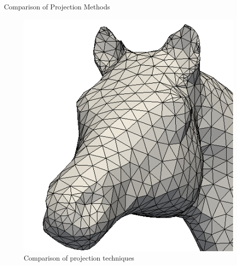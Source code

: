 \documentclass{beamer}
\begin{document}
\begin{frame}[plain]{Comparison of Projection Methods}
\begin{figure}
\begin{minipage}{.32\textwidth}
    \end{minipage} 
    \begin{minipage}{0.32\textwidth}
      \centering
      \includegraphics[width=1\linewidth]{../image/horse_mouth_1.png}
    \end{minipage}
    \caption{Comparison of projection techniques}
  \end{figure}

\end{frame}

\end{document}
